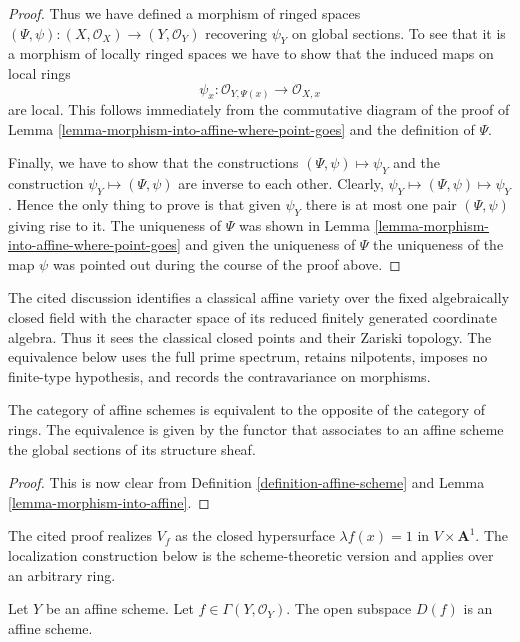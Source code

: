 \begin{proof}
\medskip\noindent
Thus we have defined a morphism of ringed spaces
$(\Psi, \psi) : (X, \mathcal{O}_X) \to (Y, \mathcal{O}_Y)$
recovering $\psi_Y$ on global sections. To see that it is
a morphism of locally ringed spaces we have to show that
the induced maps on local rings
$$
\psi_x : \mathcal{O}_{Y, \Psi(x)} \longrightarrow \mathcal{O}_{X, x}
$$
are local. This follows immediately from the commutative diagram
of the proof of Lemma \ref{lemma-morphism-into-affine-where-point-goes}
and the definition of $\Psi$.

\medskip\noindent
Finally, we have to show that the constructions
$(\Psi, \psi) \mapsto \psi_Y$ and the construction
$\psi_Y \mapsto (\Psi, \psi)$ are inverse to each other.
Clearly, $\psi_Y \mapsto (\Psi, \psi) \mapsto \psi_Y$.
Hence the only thing to prove is that given $\psi_Y$
there is at most one pair $(\Psi, \psi)$ giving rise
to it. The uniqueness of $\Psi$ was shown in Lemma
\ref{lemma-morphism-into-affine-where-point-goes} and
given the uniqueness of $\Psi$ the uniqueness of the
map $\psi$ was pointed out during the course of the proof
above.
\end{proof}

\begin{lemma}
\label{lemma-category-affine-schemes}
\begin{reference}
\cite[Chapter II, \S 4, no. 48, coordinate-ring discussion,
p. 240]{FAC}
\end{reference}
\begin{history}
The cited discussion identifies a classical affine variety over the fixed
algebraically closed field with the character space of its reduced finitely
generated coordinate algebra. Thus it sees the classical closed points and
their Zariski topology. The equivalence below uses the full prime spectrum,
retains nilpotents, imposes no finite-type hypothesis, and records the
contravariance on morphisms.
\end{history}
The category of affine schemes is equivalent to the opposite of the
category of rings. The equivalence is given by the functor that associates
to an affine scheme the global sections of its structure sheaf.
\end{lemma}

\begin{proof}
This is now clear from Definition \ref{definition-affine-scheme}
and Lemma \ref{lemma-morphism-into-affine}.
\end{proof}

\begin{lemma}
\label{lemma-standard-open-affine}
\begin{reference}
\cite[Chapter II, \S 3, no. 42, Proposition 2, p. 234]{FAC}
\end{reference}
\begin{history}
The cited proof realizes $V_f$ as the closed hypersurface
$\lambda f(x)=1$ in $V \times \mathbf{A}^1$. The localization construction
below is the scheme-theoretic version and applies over an arbitrary ring.
\end{history}
Let $Y$ be an affine scheme.
Let $f \in \Gamma(Y, \mathcal{O}_Y)$.
The open subspace $D(f)$ is an affine scheme.
\end{lemma}

